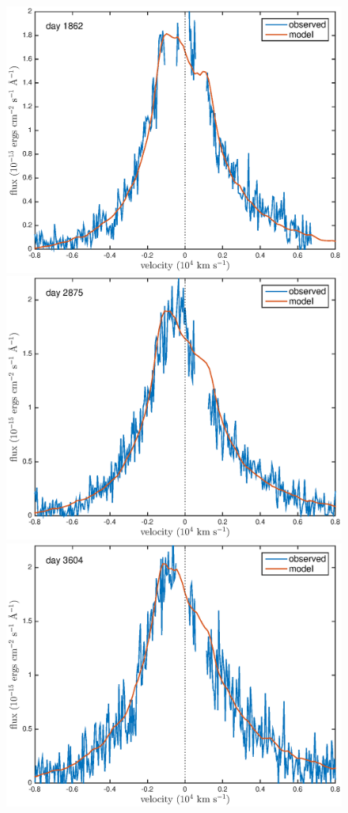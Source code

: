 \documentclass[useAMS,usenatbib,usegraphicx]{mnras}
\begin{document}
\begin{figure}
\begin{center}
\includegraphics[trim =37 10 45 15,clip=true,scale=0.35]{smooth/best_fit/d1862Ha}
\includegraphics[trim =55 10 45 15,clip=true,scale=0.35]{smooth/best_fit/d2875Ha}
\includegraphics[trim =55 10 45 15,clip=true,scale=0.35]{smooth/best_fit/d3604Ha}

\end{center}
\end{figure}
\end{document}

